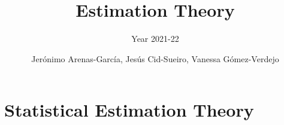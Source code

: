\documentclass[graybox,envcountchap,sectrefs]{svmono_mod}
\begin{document}
\author{Jer\'onimo Arenas-Garc\'ia, Jes\'us Cid-Sueiro, Vanessa G\'omez-Verdejo}
\title{Estimation Theory}
\subtitle{Year 2021-22}

\frontmatter


\chapter{Statistical Estimation Theory}
\mainmatter %
\tableofcontents

\newpage







\backmatter
\printindex
\end{document}
